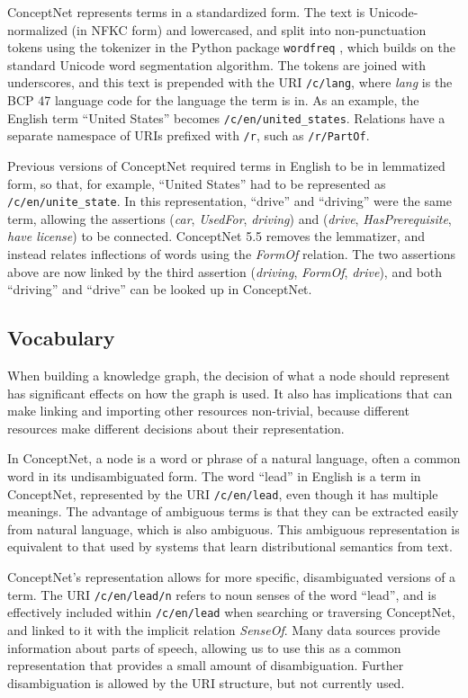 \documentclass[letterpaper]{article}
\begin{document}
ConceptNet represents terms in a standardized form. The text is
Unicode-normalized (in NFKC form) and lowercased, and split into
non-punctuation tokens using the tokenizer in the Python package
\texttt{wordfreq} \cite{speer2016wordfreq}, which builds on the standard Unicode word
segmentation algorithm. The tokens are joined with underscores, and this
text is prepended with the URI \texttt{/c/lang}, where \emph{lang} is
the BCP 47 language code for the language the term is in. As an example,
the English term ``United States'' becomes
\texttt{/c/en/united\_states}. Relations have a separate namespace of
URIs prefixed with \texttt{/r}, such as \texttt{/r/PartOf}.

Previous versions of ConceptNet required terms in English to be in lemmatized
form, so that, for example, ``United States'' had to be represented as
\texttt{/c/en/unite\_state}. In this representation, ``drive'' and ``driving'' were
the same term, allowing the assertions (\emph{car}, \emph{UsedFor},
\emph{driving}) and (\emph{drive}, \emph{HasPrerequisite}, \emph{have license})
to be connected. ConceptNet 5.5 removes the lemmatizer, and instead
relates inflections of words using the \emph{FormOf} relation. The two
assertions above are now linked by the third assertion (\emph{driving},
\emph{FormOf}, \emph{drive}), and both ``driving'' and ``drive'' can be looked
up in ConceptNet.

\subsection{Vocabulary}\label{vocabulary}

When building a knowledge graph, the decision of what a node should
represent has significant effects on how the graph is used. It also has
implications that can make linking and importing other resources
non-trivial, because different resources make different decisions about
their representation.

In ConceptNet, a node is a word or phrase of a natural language, often a common
word in its undisambiguated form. The word ``lead'' in English is a term in
ConceptNet, represented by the URI \texttt{/c/en/lead}, even though it has
multiple meanings. The advantage of ambiguous terms is that they can be
extracted easily from natural language, which is also ambiguous. This ambiguous
representation is equivalent to that used by systems that learn distributional
semantics from text.

ConceptNet's representation allows for more specific, disambiguated
versions of a term. The URI \texttt{/c/en/lead/n} refers to noun senses
of the word ``lead'', and is effectively included within
\texttt{/c/en/lead} when searching or traversing ConceptNet, and
linked to it with the implicit relation \emph{SenseOf}. Many data
sources provide information about parts of speech, allowing us to use
this as a common representation that provides a small amount of
disambiguation. Further disambiguation is allowed by the URI structure,
but not currently used.
\end{document}
